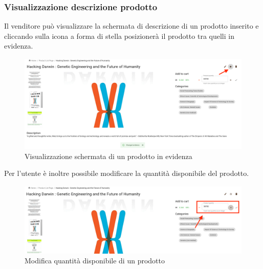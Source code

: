 \subsubsection{Visualizzazione descrizione prodotto}
Il venditore può visualizzare la schermata di descrizione di un prodotto inserito e cliccando sulla icona a forma di stella posizionerà il prodotto tra quelli in evidenza.
\begin{figure}[H]
	\centering
	\includegraphics[scale=0.25]{Immagini/Venditore/pdp-evidence-setted.seller.png}
	\caption{Visualizzazione schermata di un prodotto in evidenza}
	\label{fig:VisualizzazioneProdotto}
\end{figure}
Per l'utente è inoltre possibile modificare la quantità disponibile del prodotto. 
\begin{figure}[H]
	\centering
	\includegraphics[scale=0.25]{Immagini/Venditore/pdp-changing-quantity.seller.png}
	\caption{Modifica quantità disponibile di un prodotto}
	\label{fig:QuantitàProdotto}
\end{figure}
